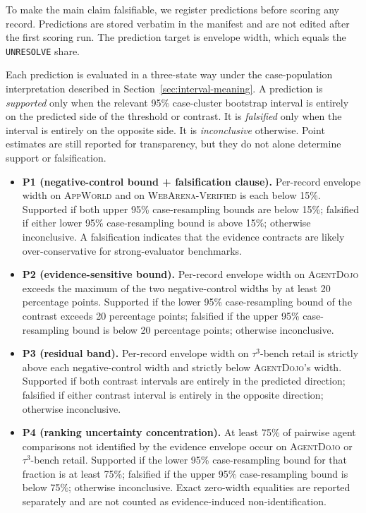 \documentclass{article}
\newcommand{\agentdojo}{\textsc{AgentDojo}\xspace}
\newcommand{\appworld}{\textsc{AppWorld}\xspace}
\newcommand{\webarena}{\textsc{WebArena-Verified}\xspace}
\newcommand{\tauthree}{\(\tau^3\)-bench retail\xspace}
\begin{document}
To make the main claim falsifiable, we register predictions before scoring any
record. Predictions are stored verbatim in the manifest and are not edited
after the first scoring run. The prediction target is envelope width, which
equals the \texttt{UNRESOLVE} share.

Each prediction is evaluated in a three-state way under the case-population
interpretation described in Section~\ref{sec:interval-meaning}. A prediction is
\emph{supported} only when the relevant 95\% case-cluster bootstrap interval is
entirely on the predicted side of the threshold or contrast. It is
\emph{falsified} only when the interval is entirely on the opposite side. It is
\emph{inconclusive} otherwise. Point estimates are still reported for
transparency, but they do not alone determine support or falsification.

\begin{itemize}\itemsep0.15em
\item \textbf{P1 (negative-control bound + falsification clause).} Per-record
envelope width on \appworld and on \webarena is each below 15\%. Supported if
both upper 95\% case-resampling bounds are below 15\%; falsified if either
lower 95\% case-resampling bound is above 15\%; otherwise inconclusive. A
falsification indicates that the evidence contracts are likely
over-conservative for strong-evaluator benchmarks.
\item \textbf{P2 (evidence-sensitive bound).} Per-record envelope width on
\agentdojo exceeds the maximum of the two negative-control widths by at least
20 percentage points. Supported if the lower 95\% case-resampling bound of the
contrast exceeds 20 percentage points; falsified if the upper 95\%
case-resampling bound is below 20 percentage points; otherwise inconclusive.
\item \textbf{P3 (residual band).} Per-record envelope width on \tauthree is
strictly above each negative-control width and strictly below \agentdojo's
width. Supported if both contrast intervals are entirely in the predicted
direction; falsified if either contrast interval is entirely in the opposite
direction; otherwise inconclusive.
\item \textbf{P4 (ranking uncertainty concentration).} At least 75\% of
pairwise agent comparisons not identified by the evidence envelope occur on
\agentdojo or \tauthree. Supported if the lower 95\% case-resampling bound for
that fraction is at least 75\%; falsified if the upper 95\% case-resampling
bound is below 75\%; otherwise inconclusive. Exact zero-width equalities are
reported separately and are not counted as evidence-induced non-identification.
\end{itemize}
\end{document}
